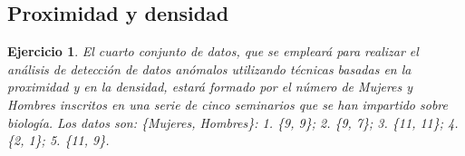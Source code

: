 \documentclass[12pt]{report}\usepackage[]{graphicx}\usepackage[dvipsnames]{xcolor}
\newtheorem{exercise}{Ejercicio}[section]
\begin{document}
			\subsection{Proximidad y densidad}
			
				\begin{exercise}
					El cuarto conjunto de datos, que se empleará para realizar el análisis de detección de datos anómalos utilizando técnicas basadas en la proximidad y en la densidad, estará formado por el número de Mujeres y Hombres inscritos en una serie de cinco seminarios que se han impartido sobre biología. Los datos son: \{Mujeres, Hombres\}: 1. \{9, 9\}; 2. \{9, 7\}; 3. \{11, 11\}; 4. \{2, 1\}; 5. \{11, 9\}.
				\end{exercise}
	
\end{document}
